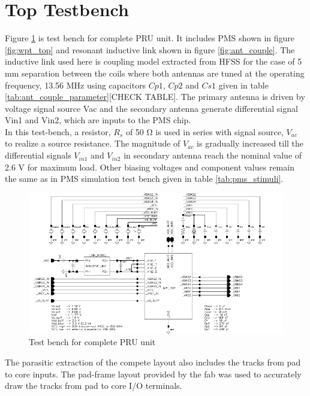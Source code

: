 \documentclass[UKenglish]{ifimaster}  %
\begin{document}
\section{Top Testbench} %

Figure \ref{fig:wpt_top_link} is test bench for complete PRU unit. It includes PMS shown in figure \ref{fig:wpt_top} and resonant inductive link shown in figure \ref{fig:ant_couple}. The inductive link used here is coupling model extracted from HFSS for the case of 5 mm separation between the coils where both antennas are tuned at the operating frequency, 13.56 MHz using capacitors $Cp1$, $Cp2$ and $Cs1$ given in table \ref{tab:ant_couple_parameter}[CHECK TABLE]. The primary antenna is driven by voltage signal source Vac and the secondary antenna generate differential signal Vin1 and Vin2, which are inputs to the PMS chip. \\

In this test-bench, a resistor, $R_{s}$ of  50 \si{\ohm} is used in series with signal source, $V_{ac}$ to realize a 
source resistance. The magnitude of $V_{ac}$ is gradually increased till the differential signals $V_{in1}$ and $V_{in2}$ 
in secondary antenna reach the nominal value of 2.6 \si{\volt} for maximum load. Other biasing voltages and component 
values remain the same as in PMS simulation test bench given in table \ref{tab:pms_stimuli}. \\

\begin{figure} [H]
  \centering
  \includegraphics[width=\textwidth]{img/wpt_top_link.pdf} 
 \caption{Test bench for complete PRU unit } 
\label{fig:wpt_top_link} 
\end{figure}

The parasitic extraction of the compete layout also includes the tracks from pad to core inputs. The pad-frame layout provided by the fab was used to accurately draw the tracks from pad to core I/O terminals. \\
\end{document}
